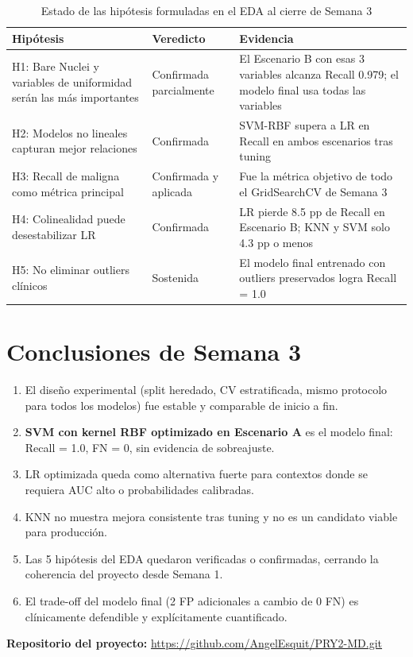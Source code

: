 \documentclass[11pt,a4paper]{article}
\begin{document}
\begin{table}[H]
\centering
\caption{Estado de las hipótesis formuladas en el EDA al cierre de Semana 3}
\renewcommand{\arraystretch}{1.3}
\begin{tabularx}{\textwidth}{l l X}
\toprule
\textbf{Hipótesis} & \textbf{Veredicto} & \textbf{Evidencia} \\
\midrule
\rowcolor{bestrow}
H1: Bare Nuclei y variables de uniformidad serán las más importantes & Confirmada parcialmente & El Escenario B con esas 3 variables alcanza Recall 0.979; el modelo final usa todas las variables \\
H2: Modelos no lineales capturan mejor relaciones & Confirmada & SVM-RBF supera a LR en Recall en ambos escenarios tras tuning \\
\rowcolor{bestrow}
H3: Recall de maligna como métrica principal & Confirmada y aplicada & Fue la métrica objetivo de todo el GridSearchCV de Semana 3 \\
H4: Colinealidad puede desestabilizar LR & Confirmada & LR pierde 8.5 pp de Recall en Escenario B; KNN y SVM solo 4.3 pp o menos \\
\rowcolor{bestrow}
H5: No eliminar outliers clínicos & Sostenida & El modelo final entrenado con outliers preservados logra Recall = 1.0 \\
\bottomrule
\end{tabularx}
\end{table}

\section{Conclusiones de Semana 3}

\begin{enumerate}[leftmargin=1.4cm]
\item El diseño experimental (split heredado, CV estratificada, mismo protocolo para todos los modelos) fue estable y comparable de inicio a fin.
\item \textbf{SVM con kernel RBF optimizado en Escenario A} es el modelo final: Recall = 1.0, FN = 0, sin evidencia de sobreajuste.
\item LR optimizada queda como alternativa fuerte para contextos donde se requiera AUC alto o probabilidades calibradas.
\item KNN no muestra mejora consistente tras tuning y no es un candidato viable para producción.
\item Las 5 hipótesis del EDA quedaron verificadas o confirmadas, cerrando la coherencia del proyecto desde Semana 1.
\item El trade-off del modelo final (2 FP adicionales a cambio de 0 FN) es clínicamente defendible y explícitamente cuantificado.
\end{enumerate}

\vspace{1em}
\noindent\textbf{Repositorio del proyecto:}
\url{https://github.com/AngelEsquit/PRY2-MD.git}
\end{document}
